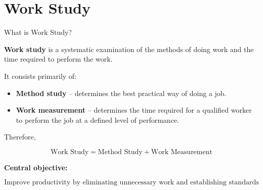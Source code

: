 \documentclass[aspectratio=169,10pt]{beamer}
\begin{document}

\section{Work Study}

\begin{frame}[shrink=18]{What is Work Study?}
\small

\textbf{Work study} is a systematic examination of the methods of doing work
and the time required to perform the work.

\vspace{4pt}

It consists primarily of:

\begin{itemize}
    \item \textbf{Method study} -- determines the best practical way of doing a job.
    \item \textbf{Work measurement} -- determines the time required for a qualified worker
    to perform the job at a defined level of performance.
\end{itemize}

\vspace{4pt}

Therefore,

\[
\boxed{
\text{Work Study}
=
\text{Method Study}
+
\text{Work Measurement}
}
\]

\textbf{Central objective:}

\[
\boxed{
\text{Improve productivity by eliminating unnecessary work and establishing standards}
}
\]

\end{frame}

\end{document}
